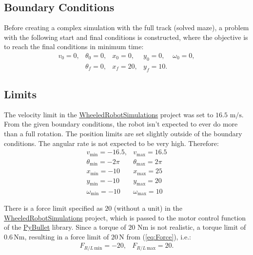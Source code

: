 \documentclass[12pt]{article}
\numberwithin{equation}{section} %
\numberwithin{figure}{section} %
\begin{document}
\subsection{Boundary Conditions}

Before creating a complex simulation with the full track (solved maze), a problem with the following start and final conditions is constructed, where the objective is to reach the final conditions in minimum time:
\begin{equation}
	\begin{matrix}
		v_0 = 0, & \theta_0 = 0, & x_0 = 0, & y_0 = 0, & \omega_0 = 0, \\
		& \theta_f = 0, & x_f = 20, & y_f = 10. &
	\end{matrix} \nonumber
\end{equation}

\subsection{Limits}
\label{sec:Limits}

The velocity limit in the {\color{blue} \href{https://github.com/Yurof/WheeledRobotSimulations}{WheeledRobotSimulations}} project was set to $16.5$ $\mathrm{m/s}$. From the given boundary conditions, the robot isn't expected to ever do more than a full rotation. The position limits are set slightly outside of the boundary conditions. The angular rate is not expected to be very high. Therefore:
\begin{equation}
	\begin{matrix}
		v_\mathrm{min} = -16.5, & v_\mathrm{max} = 16.5 \\
		\theta_\mathrm{min} = - 2 \pi & \theta_\mathrm{max} = 2 \pi \\
		x_\mathrm{min} = - 10 & x_\mathrm{max} = 25 \\
		y_\mathrm{min} = - 10 & y_\mathrm{max} = 20 \\
		\omega_\mathrm{min} = - 10 & \omega_\mathrm{max} = 10
	\end{matrix} \nonumber
\end{equation}

There is a force limit specified as $20$ (without a unit) in the {\color{blue} \href{https://github.com/Yurof/WheeledRobotSimulations}{WheeledRobotSimulations}} project, which is passed to the motor control function of the {\color{blue} \href{https://github.com/bulletphysics/bullet3}{PyBullet}} library. Since a torque of  $20$ $\mathrm{Nm}$ is not realistic, a torque limit of $0.6 \, \mathrm{Nm}$, resulting in a force limit of $20 \, \mathrm{N}$ from (\ref{eq:Force}), i.e.:
\begin{equation}
	\begin{matrix}
		F_{R/L \, \mathrm{min}} = -20, & F_{R/L \, \mathrm{max}} = 20.
	\end{matrix} \nonumber
\end{equation}
\end{document}
